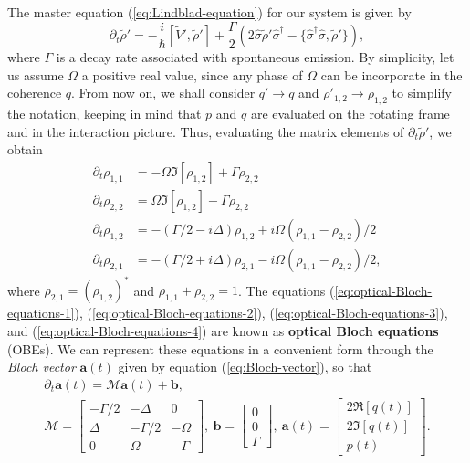 The master equation (\ref{eq:Lindblad-equation}) for our system is given by
\begin{equation}
	\partial_t \tilde{\rho}' = - \frac{i}{\hbar} [\tilde{V}', \tilde{\rho}'] + \frac{\Gamma}{2} (2\hat{\sigma}\tilde{\rho}'\hat{\sigma}^{\dagger} - \{\hat{\sigma}^{\dagger}\hat{\sigma}, \tilde{\rho}'\}),
	\label{eq:master-equaton-two-level-system}
\end{equation}
where $ \Gamma $ is a decay rate associated with spontaneous emission. By simplicity, let us assume $ \Omega $ a positive real value, since any phase of $ \Omega $ can be incorporate in the coherence $ q $. From now on, we shall consider $ q' \rightarrow q $ and $ \rho'_{1,2} \rightarrow \rho_{1,2} $ to simplify the notation, keeping in mind that $ p $ and $ q $ are evaluated on the rotating frame and in the interaction picture. Thus, evaluating the matrix elements of $ \partial_t \tilde{\rho}' $, we obtain
\begin{align}
	\partial_t \rho_{1,1} &= - \Omega\Im[\rho_{1,2}] + \Gamma \rho_{2,2}
	\label{eq:optical-Bloch-equations-1}
	\\ 
	\partial_t \rho_{2,2} &= \Omega\Im[\rho_{1,2}] - \Gamma \rho_{2,2} 
	\label{eq:optical-Bloch-equations-2}
	\\ 
	\partial_t \rho_{1,2} &= - (\Gamma / 2 - i \Delta) \rho_{1,2} + i\Omega (\rho_{1,1} - \rho_{2,2}) / 2 
	\label{eq:optical-Bloch-equations-3}
	\\
	\partial_t \rho_{2,1} &= - (\Gamma / 2 + i \Delta) \rho_{2,1} - i\Omega (\rho_{1,1} - \rho_{2,2}) / 2,
	\label{eq:optical-Bloch-equations-4}
\end{align}
where $ \rho_{2,1} = (\rho_{1,2})^* $ and $ \rho_{1,1} + \rho_{2,2} = 1 $. The equations (\ref{eq:optical-Bloch-equations-1}), (\ref{eq:optical-Bloch-equations-2}), (\ref{eq:optical-Bloch-equations-3}), and (\ref{eq:optical-Bloch-equations-4}) are known as \textbf{optical Bloch equations} (OBEs). We can represent these equations in a convenient form through the \textit{Bloch vector} $ \mathbf{a}(t) $ given by equation (\ref{eq:Bloch-vector}), so that
\begin{gather}
	\partial_t \mathbf{a}(t) = \mathcal{M}\mathbf{a}(t) + \mathbf{b},
	\label{eq:optical-Bloch-equations-Bloch-vector}
	\\
	\mathcal{M} = \left[ \begin{matrix} 
		-\Gamma/2 & - \Delta & 0 \\  
		\Delta & -\Gamma/2 & -\Omega \\
		0 & \Omega & -\Gamma
	\end{matrix} \right],\ \mathbf{b} = \left[ \begin{matrix} 0 \\ 0 \\ \Gamma \end{matrix} \right],\ \mathbf{a}(t) = \left[ \begin{matrix} 2\Re[q(t)] \\ 2\Im[q(t)] \\ p(t) \end{matrix} \right].
\end{gather}
